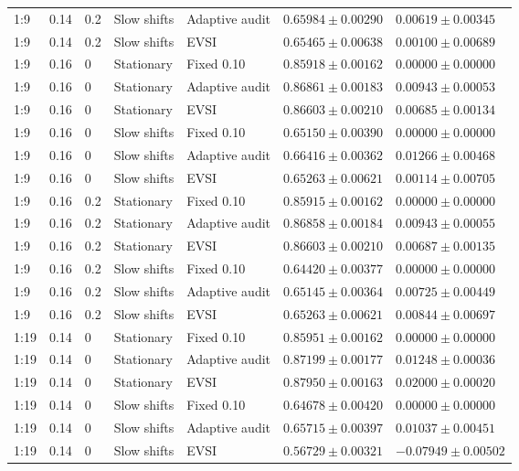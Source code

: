 \begin{longtable}{@{}lllllll@{}}
1:9 & 0.14 & 0.2 & Slow shifts & Adaptive audit & $0.65984 \pm 0.00290$ & $0.00619 \pm 0.00345$ \\
1:9 & 0.14 & 0.2 & Slow shifts & EVSI & $0.65465 \pm 0.00638$ & $0.00100 \pm 0.00689$ \\
1:9 & 0.16 & 0 & Stationary & Fixed 0.10 & $0.85918 \pm 0.00162$ & $0.00000 \pm 0.00000$ \\
1:9 & 0.16 & 0 & Stationary & Adaptive audit & $0.86861 \pm 0.00183$ & $0.00943 \pm 0.00053$ \\
1:9 & 0.16 & 0 & Stationary & EVSI & $0.86603 \pm 0.00210$ & $0.00685 \pm 0.00134$ \\
1:9 & 0.16 & 0 & Slow shifts & Fixed 0.10 & $0.65150 \pm 0.00390$ & $0.00000 \pm 0.00000$ \\
1:9 & 0.16 & 0 & Slow shifts & Adaptive audit & $0.66416 \pm 0.00362$ & $0.01266 \pm 0.00468$ \\
1:9 & 0.16 & 0 & Slow shifts & EVSI & $0.65263 \pm 0.00621$ & $0.00114 \pm 0.00705$ \\
1:9 & 0.16 & 0.2 & Stationary & Fixed 0.10 & $0.85915 \pm 0.00162$ & $0.00000 \pm 0.00000$ \\
1:9 & 0.16 & 0.2 & Stationary & Adaptive audit & $0.86858 \pm 0.00184$ & $0.00943 \pm 0.00055$ \\
1:9 & 0.16 & 0.2 & Stationary & EVSI & $0.86603 \pm 0.00210$ & $0.00687 \pm 0.00135$ \\
1:9 & 0.16 & 0.2 & Slow shifts & Fixed 0.10 & $0.64420 \pm 0.00377$ & $0.00000 \pm 0.00000$ \\
1:9 & 0.16 & 0.2 & Slow shifts & Adaptive audit & $0.65145 \pm 0.00364$ & $0.00725 \pm 0.00449$ \\
1:9 & 0.16 & 0.2 & Slow shifts & EVSI & $0.65263 \pm 0.00621$ & $0.00844 \pm 0.00697$ \\
1:19 & 0.14 & 0 & Stationary & Fixed 0.10 & $0.85951 \pm 0.00162$ & $0.00000 \pm 0.00000$ \\
1:19 & 0.14 & 0 & Stationary & Adaptive audit & $0.87199 \pm 0.00177$ & $0.01248 \pm 0.00036$ \\
1:19 & 0.14 & 0 & Stationary & EVSI & $0.87950 \pm 0.00163$ & $0.02000 \pm 0.00020$ \\
1:19 & 0.14 & 0 & Slow shifts & Fixed 0.10 & $0.64678 \pm 0.00420$ & $0.00000 \pm 0.00000$ \\
1:19 & 0.14 & 0 & Slow shifts & Adaptive audit & $0.65715 \pm 0.00397$ & $0.01037 \pm 0.00451$ \\
1:19 & 0.14 & 0 & Slow shifts & EVSI & $0.56729 \pm 0.00321$ & $-0.07949 \pm 0.00502$ \\

\end{longtable}
